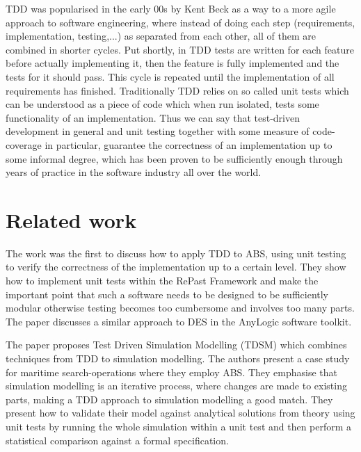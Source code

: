 TDD was popularised in the early 00s by Kent Beck \cite{beck_test_2002} as a way to a more agile approach to software engineering, where instead of doing each step (requirements, implementation, testing,...) as separated from each other, all of them are combined in shorter cycles. Put shortly, in TDD tests are written for each feature before actually implementing it, then the feature is fully implemented and the tests for it should pass. This cycle is repeated until the implementation of all requirements has finished. Traditionally TDD relies on so called unit tests which can be understood as a piece of code which when run isolated, tests some functionality of an implementation. Thus we can say that test-driven development in general and unit testing together with some measure of code-coverage in particular, guarantee the correctness of an implementation up to some informal degree, which has been proven to be sufficiently enough through years of practice in the software industry all over the world. 

\medskip

\section*{Related work}
The work \cite{collier_test-driven_2013} was the first to discuss how to apply TDD to ABS, using unit testing to verify the correctness of the implementation up to a certain level. They show how to implement unit tests within the RePast Framework \cite{north_complex_2013} and make the important point that such a software needs to be designed to be sufficiently modular otherwise testing becomes too cumbersome and involves too many parts. The paper \cite{asta_investigation_2014} discusses a similar approach to DES in the AnyLogic software toolkit. 

The paper \cite{onggo_test-driven_2016} proposes Test Driven Simulation Modelling (TDSM) which combines techniques from TDD to simulation modelling. The authors present a case study for maritime search-operations where they employ ABS. They emphasise that simulation modelling is an iterative process, where changes are made to existing parts, making a TDD approach to simulation modelling a good match. They present how to validate their model against analytical solutions from theory using unit tests by running the whole simulation within a unit test and then perform a statistical comparison against a formal specification. %

